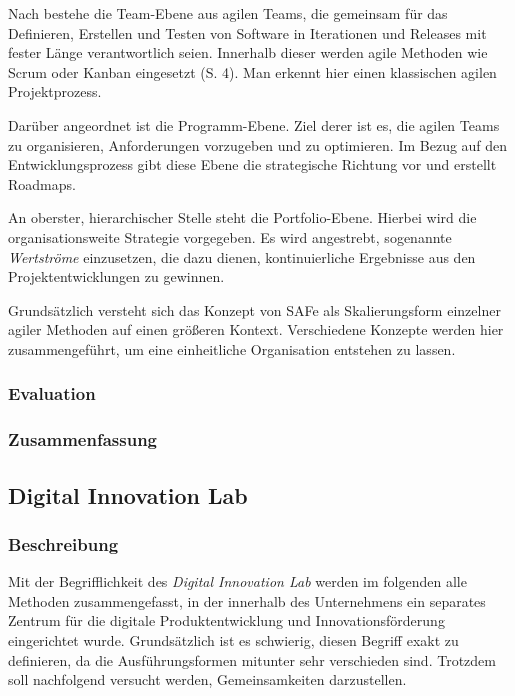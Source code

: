 Nach  bestehe die Team-Ebene aus agilen Teams, die gemeinsam für das Definieren, Erstellen und Testen von Software in Iterationen und Releases mit fester Länge verantwortlich seien. Innerhalb dieser werden agile Methoden wie Scrum oder Kanban eingesetzt (S. 4). Man erkennt hier einen klassischen agilen Projektprozess.

Darüber angeordnet ist die Programm-Ebene. Ziel derer ist es, die agilen Teams zu organisieren, Anforderungen vorzugeben und zu optimieren. Im Bezug auf den Entwicklungsprozess gibt diese Ebene die strategische Richtung vor und erstellt Roadmaps. \cite[S. 5]{turetken_assessing_2017}

An oberster, hierarchischer Stelle  steht  die Portfolio-Ebene. Hierbei wird die organisationsweite Strategie vorgegeben. Es wird angestrebt, sogenannte \textit{Wertströme} einzusetzen, die dazu dienen, kontinuierliche  Ergebnisse aus den Projektentwicklungen zu gewinnen.

Grundsätzlich versteht sich das Konzept von SAFe als Skalierungsform einzelner agiler Methoden auf einen größeren Kontext. Verschiedene Konzepte werden hier zusammengeführt, um eine einheitliche Organisation entstehen zu lassen.

\subsubsection{Evaluation}

\todots

\subsubsection{Zusammenfassung}

\todots

\subsection{Digital Innovation Lab}

\subsubsection{Beschreibung}

Mit der Begrifflichkeit des \textit{Digital Innovation Lab} werden im folgenden alle Methoden zusammengefasst, in der innerhalb des Unternehmens ein separates Zentrum für die digitale Produktentwicklung und Innovationsförderung eingerichtet wurde. Grundsätzlich ist es schwierig, diesen Begriff exakt zu definieren, da die Ausführungsformen mitunter sehr verschieden sind. Trotzdem soll nachfolgend versucht werden, Gemeinsamkeiten darzustellen.

